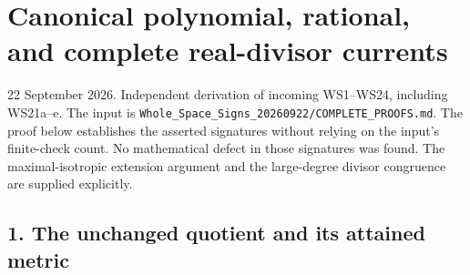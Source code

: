 \documentclass[11pt]{article}
\begin{document}
\clearpage
\section{Canonical polynomial, rational, and complete real-divisor currents}\label{part2-canonical-polynomial-rational-and-complete-real-divisor-currents}

22 September 2026. Independent derivation of incoming WS1--WS24, including WS21a--e. The input is \texttt{Whole\_\allowbreak{}Space\_\allowbreak{}Signs\_\allowbreak{}20260922/\allowbreak{}COMPLETE\_\allowbreak{}PROOFS.md}. The proof below establishes the asserted signatures without relying on the input's finite-check count. No mathematical defect in those signatures was found. The maximal-isotropic extension argument and the large-degree divisor congruence are supplied explicitly.

\subsection{1. The unchanged quotient and its attained metric}\label{part2-the-unchanged-quotient-and-its-attained-metric}
\end{document}
